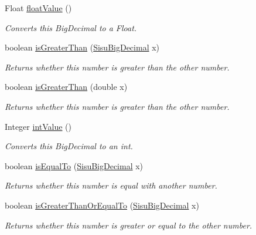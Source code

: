 \begin{DoxyCompactItemize}
Float \hyperlink{classcom_1_1aarrelaakso_1_1drawl_1_1_sisu_big_decimal_ad797c1167dea95aadaa653ee7f3cbf91}{float\+Value} ()
\begin{DoxyCompactList}\small\item\em Converts this Big\+Decimal to a Float. \end{DoxyCompactList}\item 
boolean \hyperlink{classcom_1_1aarrelaakso_1_1drawl_1_1_sisu_big_decimal_ab9dc87c361a7ffd236c1cee1bc677f12}{is\+Greater\+Than} (\hyperlink{classcom_1_1aarrelaakso_1_1drawl_1_1_sisu_big_decimal}{Sisu\+Big\+Decimal} x)
\begin{DoxyCompactList}\small\item\em Returns whether this number is greater than the other number. \end{DoxyCompactList}\item 
boolean \hyperlink{classcom_1_1aarrelaakso_1_1drawl_1_1_sisu_big_decimal_a89df07cdc9c356d097db099d609335dc}{is\+Greater\+Than} (double x)
\begin{DoxyCompactList}\small\item\em Returns whether this number is greater than the other number. \end{DoxyCompactList}\item 
Integer \hyperlink{classcom_1_1aarrelaakso_1_1drawl_1_1_sisu_big_decimal_a8d02465f77c81ac072066766db81d196}{int\+Value} ()
\begin{DoxyCompactList}\small\item\em Converts this Big\+Decimal to an int. \end{DoxyCompactList}\item 
boolean \hyperlink{classcom_1_1aarrelaakso_1_1drawl_1_1_sisu_big_decimal_a0c8a57da15ab119fd46af9292ccfe028}{is\+Equal\+To} (\hyperlink{classcom_1_1aarrelaakso_1_1drawl_1_1_sisu_big_decimal}{Sisu\+Big\+Decimal} x)
\begin{DoxyCompactList}\small\item\em Returns whether this number is equal with another number. \end{DoxyCompactList}\item 
boolean \hyperlink{classcom_1_1aarrelaakso_1_1drawl_1_1_sisu_big_decimal_aa6c1b25dee6e289b50c85dd9e03df0f6}{is\+Greater\+Than\+Or\+Equal\+To} (\hyperlink{classcom_1_1aarrelaakso_1_1drawl_1_1_sisu_big_decimal}{Sisu\+Big\+Decimal} x)
\begin{DoxyCompactList}\small\item\em Returns whether this number is greater or equal to the other number. \end{DoxyCompactList}\item 

\end{DoxyCompactItemize}
